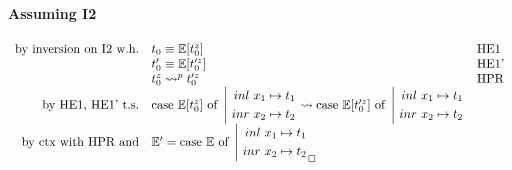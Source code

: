 \documentclass{article}
\begin{document}
\paragraph{Assuming I2}
\[
    \begin{array}{rl @{\quad} l}
        \text{by inversion on I2 w.h.}   &  t_0  \equiv \mE[t_0^z]         & \text{HE1}\\
                                         &  t_0' \equiv \mE[t_0'^z]        & \text{HE1'}\\
                                         &  t_0^z \leadsto^p t_0'^z     & \text{HPR}\\
        \text{by HE1, HE1' t.s.}         &  \case{\ \mE[t_0^z]}{\inl x_1 \mapsto t_1}{\inr x_2 \mapsto t_2} \leadsto \case{\ \mE[t_0'^z]}{\inl x_1 \mapsto t_1}{\inr x_2 \mapsto t_2} \\
        \text{by ctx with HPR and}       &  \mE' = \case{\ \mE}{\inl x_1 \mapsto t_1}{\inr x_2 \mapsto t_2} _\square \\
    \end{array}
\]
\end{document}
